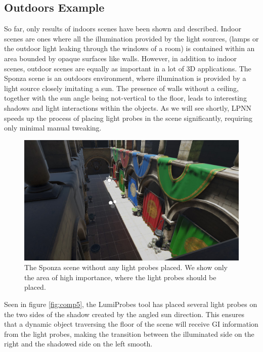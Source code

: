 \subsection{Outdoors Example}
\label{sec:outdoors}

So far, only results of indoors scenes have been shown and described. Indoor scenes are ones where all the illumination provided by the light sources, (lamps or the outdoor light leaking through the windows of a room) is contained within an area bounded by opaque surfaces like walls. However, in addition to indoor scenes, outdoor scenes are equally as important in a lot of 3D applications. The Sponza scene \parencite{Sponza2017} is an outdoors environment, where illumination is provided by a light source closely imitating a sun. The presence of walls without a ceiling, together with the sun angle being not-vertical to the floor, leads to interesting shadows and light interactions within the objects. As we will see shortly, LPNN speeds up the process of placing light probes in the scene significantly, requiring only minimal manual tweaking.

\begin{figure}[h]
	\centering
	\includegraphics[width=\linewidth]{Graphics/results/sponza.jpg}
	\caption{The Sponza scene \parencite{Sponza2017} without any light probes placed. We show only the area of high importance, where the light probes should be placed.}
	\label{fig:sponza}
\end{figure}

Seen in figure \ref{fig:comp5}, the LumiProbes tool has placed several light probes on the two sides of the shadow created by the angled sun direction. This ensures that a dynamic object traversing the floor of the scene will receive GI information from the light probes, making the transition between the illuminated side on the right and the shadowed side on the left smooth. 

